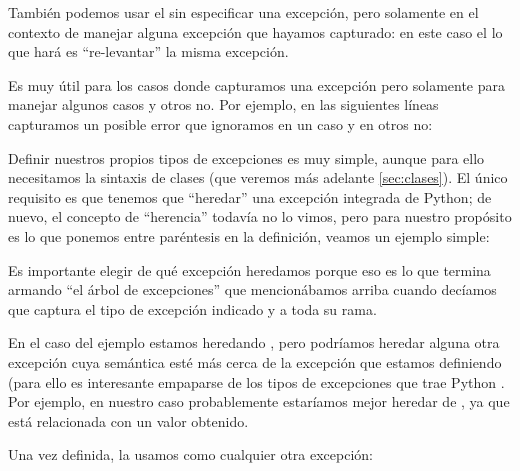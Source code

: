 También podemos usar el  sin especificar una excepción, pero solamente en el contexto de manejar alguna excepción que hayamos capturado: en este caso el  lo que hará es ``re-levantar'' la misma excepción. 

Es muy útil para los casos donde capturamos una excepción pero solamente para manejar algunos casos y otros no. Por ejemplo, en las siguientes líneas capturamos un posible error que ignoramos en un caso y en otros no:


Definir nuestros propios tipos de excepciones es muy simple, aunque para ello necesitamos la sintaxis de clases (que veremos más adelante \ref{sec:clases}). El único requisito es que tenemos que ``heredar'' una excepción integrada de Python; de nuevo, el concepto de ``herencia'' todavía no lo vimos, pero para nuestro propósito es lo que ponemos entre paréntesis en la definición, veamos un ejemplo simple:


Es importante elegir de qué excepción heredamos porque eso es lo que termina armando ``el árbol de excepciones'' que mencionábamos arriba cuando decíamos que  captura el tipo de excepción indicado y a toda su rama.

En el caso del ejemplo estamos heredando , pero podríamos heredar alguna otra excepción cuya semántica esté más cerca de la excepción que estamos definiendo (para ello es interesante empaparse de los tipos de excepciones que trae Python \cite{stdlib_exceptypes}. Por ejemplo, en nuestro caso probablemente estaríamos mejor heredar de , ya que está relacionada con un valor obtenido.

Una vez definida, la usamos como cualquier otra excepción:

